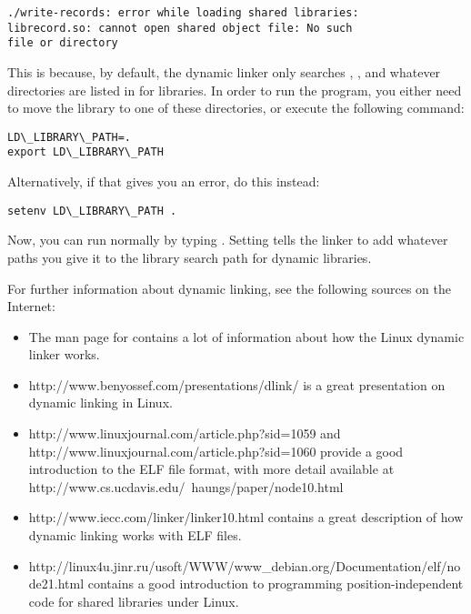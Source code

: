 \begin{simpletyping}
\begin{lstlisting}
./write-records: error while loading shared libraries: 
librecord.so: cannot open shared object file: No such 
file or directory
\end{lstlisting}
\end{simpletyping}

This is because, by default, the dynamic linker only searches 
, , and whatever
directories are listed in  for
libraries.  In order to run the program, you either need to move the
library to one of these directories, or execute the following command:

\begin{simpletyping}
\begin{lstlisting}
LD\_LIBRARY\_PATH=.
export LD\_LIBRARY\_PATH
\end{lstlisting}
\end{simpletyping}


Alternatively, if that gives you an error, do this instead:

\begin{simpletyping}
\begin{lstlisting}
setenv LD\_LIBRARY\_PATH .
\end{lstlisting}
\end{simpletyping}

Now, you can run  normally by typing
.  Setting 
 tells the linker to add whatever
paths you give it to the library search path for dynamic libraries.

For further information about dynamic linking, see the following sources
on the Internet:

\begin{itemize}\item The man page for  contains a lot of information about how the Linux dynamic linker works. 
\item http://www.benyossef.com/presentations/dlink/ is a great presentation on dynamic linking in Linux. 
\item http://www.linuxjournal.com/article.php?sid=1059 and http://www.linuxjournal.com/article.php?sid=1060 provide a good introduction to the ELF file format, with more detail available at http://www.cs.ucdavis.edu/~haungs/paper/node10.html 
\item http://www.iecc.com/linker/linker10.html contains a great description of how dynamic linking works with ELF files. 
\item http://linux4u.jinr.ru/usoft/WWW/www\_debian.org/Documentation/elf/node21.html contains a good introduction to programming position-independent code for shared libraries under Linux. 
\end{itemize}

